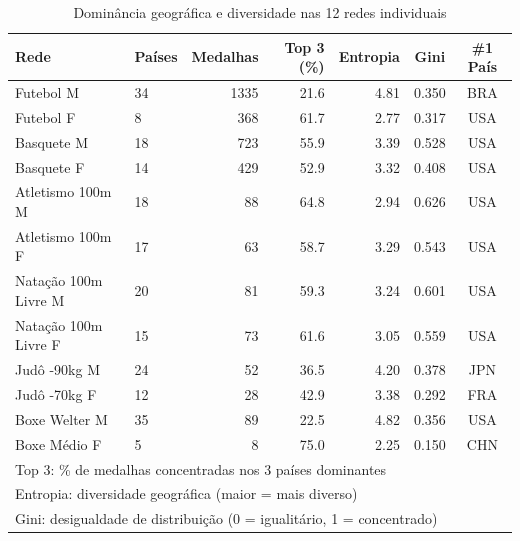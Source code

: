 \begin{table}[H]
\centering
\small
\caption{Dominância geográfica e diversidade nas 12 redes individuais}
\label{tab:geographic_summary}
\begin{tabular}{llrrrcc}
\hline
\textbf{Rede} & \textbf{Países} & \textbf{Medalhas} & \textbf{Top 3 (\%)} & \textbf{Entropia} & \textbf{Gini} & \textbf{\#1 País} \\
\hline
Futebol M & 34 & 1335 & 21.6 & 4.81 & 0.350 & BRA \\
Futebol F & 8 & 368 & 61.7 & 2.77 & 0.317 & USA \\
Basquete M & 18 & 723 & 55.9 & 3.39 & 0.528 & USA \\
Basquete F & 14 & 429 & 52.9 & 3.32 & 0.408 & USA \\
Atletismo 100m M & 18 & 88 & 64.8 & 2.94 & 0.626 & USA \\
Atletismo 100m F & 17 & 63 & 58.7 & 3.29 & 0.543 & USA \\
Natação 100m Livre M & 20 & 81 & 59.3 & 3.24 & 0.601 & USA \\
Natação 100m Livre F & 15 & 73 & 61.6 & 3.05 & 0.559 & USA \\
Judô -90kg M & 24 & 52 & 36.5 & 4.20 & 0.378 & JPN \\
Judô -70kg F & 12 & 28 & 42.9 & 3.38 & 0.292 & FRA \\
Boxe Welter M & 35 & 89 & 22.5 & 4.82 & 0.356 & USA \\
Boxe Médio F & 5 & 8 & 75.0 & 2.25 & 0.150 & CHN \\
\hline
\multicolumn{7}{l}{\footnotesize Top 3: \% de medalhas concentradas nos 3 países dominantes} \\
\multicolumn{7}{l}{\footnotesize Entropia: diversidade geográfica (maior = mais diverso)} \\
\multicolumn{7}{l}{\footnotesize Gini: desigualdade de distribuição (0 = igualitário, 1 = concentrado)} \\
\end{tabular}
\end{table}
